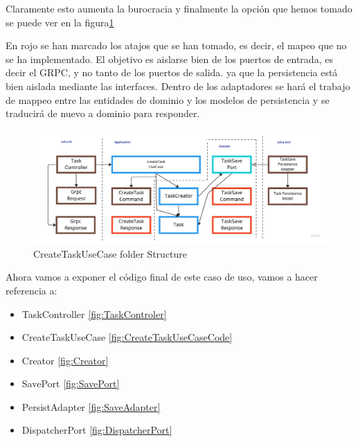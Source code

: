 Claramente esto aumenta la burocracia y finalmente la opción que hemos tomado se puede ver en la figura\ref{fig:CreateTaskUseCaseMapping}

En rojo se han marcado los atajos que se han tomado, es decir, el mapeo que no se ha implementado. El objetivo es aislarse bien de los puertos de entrada, es decir el GRPC, y no tanto de los puertos de salida. ya que la persistencia está bien aislada mediante las interfaces. Dentro de los adaptadores se hará el trabajo de mappeo entre las entidades de dominio y los modelos de persistencia y se traducirá de nuevo a dominio para responder.

\begin{figure}[H]
    \centering
    \includegraphics[height=0.2\textheight]{./part/Ejecucion/Seguimiento/CreateTaskUseCase/img/PFM - FinalMapping}
    \caption{CreateTaskUseCase folder Structure}\label{fig:CreateTaskUseCaseMapping}
\end{figure}

Ahora vamos a exponer el código final de este caso de uso, vamos a hacer referencia a:
\begin{itemize}
    \item TaskController \ref{fig:TaskControler}
    \item CreateTaskUseCase \ref{fig:CreateTaskUseCaseCode}
    \item Creator \ref{fig:Creator}
    \item SavePort \ref{fig:SavePort}
    \item PersistAdapter \ref{fig:SaveAdapter}
    \item DispatcherPort \ref{fig:DispatcherPort}
\end{itemize}

